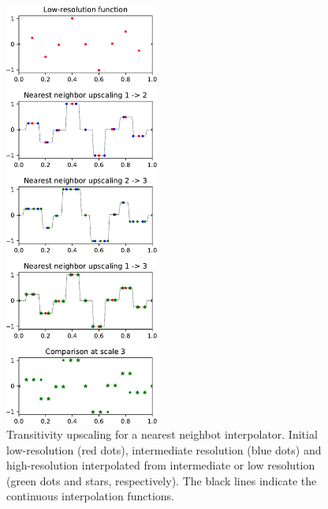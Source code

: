 \documentclass[12pt]{scrartcl}
\begin{document}
\begin{figure}[!h]
\begin{center}
\includegraphics[width=0.45\textwidth]{interpolation_comparison_nn.pdf}
\end{center}
\caption{\label{fig:nn} Transitivity upscaling for a nearest neighbot interpolator. Initial low-resolution (red dots), intermediate resolution (blue dots) and high-resolution interpolated from intermediate or low resolution (green dots and stars, respectively). The black lines indicate the continuous interpolation functions.}
\end{figure}
\end{document}
